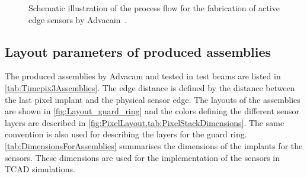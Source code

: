 \begin{figure}[htbp]
\begin{subfigure}[b]{0.3\textwidth}
    \caption{}
  \end{subfigure}

  \caption{Schematic illustration of the process flow for the
    fabrication of active edge sensors by
    Advacam~\cite{AdvacamProcessFlow}.}
  \label{fig:AdvacamProcessFlow}
\end{figure}


\newpage
\subsection{Layout parameters of produced assemblies}
\label{sec:AEgeometry}

The produced assemblies by Advacam and tested in test beams are listed
in \cref{tab:Timepix3Assemblies}. The edge distance is defined by the
distance between the last pixel implant and the physical sensor
edge. The layouts of the assemblies are shown in
\cref{fig:Layout_guard_ring} and the colors defining the different
sensor layers are described in
\cref{fig:PixelLayout,tab:PixelStackDimensions}. The same convention
is also used for describing the layers for the guard
ring. \cref{tab:DimensionsForAssemblies} summarises the dimensions of
the implants for the sensors. These dimensions are used for the
implementation of the sensors in TCAD simulations.


